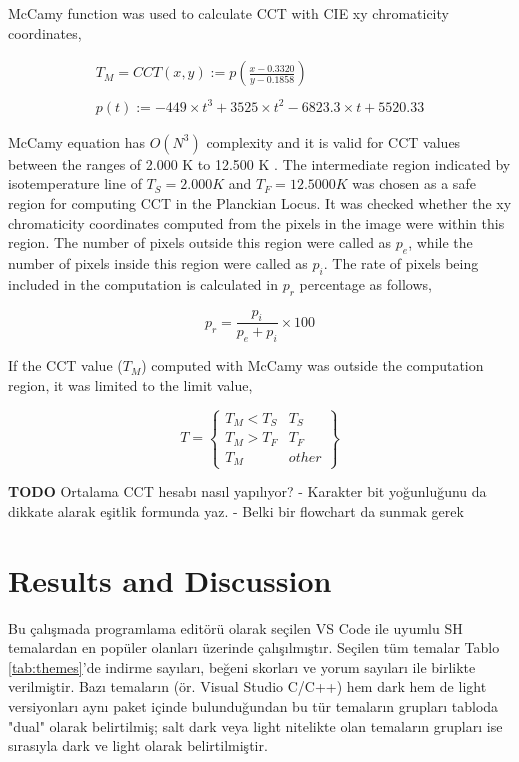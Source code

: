 \documentclass{article}
\begin{document}
McCamy function \cite{davis2020correlated} was used to calculate CCT with CIE xy chromaticity coordinates,

\begin{equation}
\begin{matrix}
    T_M = CCT(x, y) := p\left ( \frac{x-0.3320}{y-0.1858} \right )\\
    \\
    p(t) := -449 \times t^3 + 3525 \times t^2 - 6823.3 \times t + 5520.33
\end{matrix}
\label{eq:xy2TM}
\end{equation}

McCamy equation has $O(N^3)$ complexity and it is valid for CCT values between the ranges of 2.000 K to 12.500 K \cite{mccamy1992correlated, mccamy1993correlated}. The intermediate region indicated by isotemperature line of $T_S=2.000 K$ and $T_F=12.5000 K$ was chosen as a safe region for computing CCT in the Planckian Locus. It was checked whether the xy chromaticity coordinates computed from the pixels in the image were within this region. The number of pixels outside this region were called as $p_e$, while the number of pixels inside this region were called as $p_i$. The rate of pixels being included in the computation is calculated in $p_r$ percentage as follows,

\begin{equation}
p_r = \frac{p_i}{p_e + p_i} \times 100
\label{eq:pr}
\end{equation}

If the CCT value ($T_M$) computed with McCamy was outside the computation region, it was limited to the limit value,

\begin{equation}
T = \left \{ 
\begin{matrix}
T_M < T_S & T_S\\
T_M > T_F & T_F\\
T_M & other
\end{matrix}
\right \}
\label{eq:TS_TF}
\end{equation}

\textbf{TODO} Ortalama CCT hesabı nasıl yapılıyor?
- Karakter bit yoğunluğunu da dikkate alarak eşitlik formunda yaz.
- Belki bir flowchart da sunmak gerek

\section{Results and Discussion}

Bu çalışmada programlama editörü olarak seçilen VS Code ile uyumlu SH temalardan en popüler olanları üzerinde
çalışılmıştır.  Seçilen tüm temalar Tablo \ref{tab:themes}'de indirme sayıları, beğeni skorları ve yorum sayıları ile
birlikte verilmiştir.  Bazı temaların (ör. Visual Studio C/C++) hem dark hem de light versiyonları aynı paket içinde
bulunduğundan bu tür temaların grupları tabloda "dual" olarak belirtilmiş; salt dark veya light nitelikte olan temaların
grupları ise sırasıyla dark ve light olarak belirtilmiştir.
\end{document}
